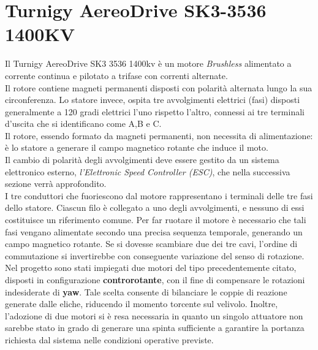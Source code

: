 \section{Turnigy AereoDrive SK3-3536 1400KV}
\label{MotoriBrushless}
Il Turnigy AereoDrive SK3 3536 1400kv è un motore \textit{Brushless} alimentato a corrente continua e pilotato a trifase con correnti alternate.\\
Il rotore contiene magneti permanenti disposti con polarità alternata lungo la sua circonferenza. Lo statore invece, ospita tre avvolgimenti elettrici (fasi) disposti generalmente a 120 gradi elettrici l'uno rispetto l'altro, connessi ai tre terminali d'uscita che si identificano come A,B e C.\\
Il rotore, essendo formato da magneti permanenti, non necessita di alimentazione: è lo statore a generare il campo magnetico rotante che induce il moto.\\
Il cambio di polarità degli avvolgimenti deve essere gestito da un sistema elettronico esterno, \textit{l'Elettronic Speed Controller (ESC)}, che nella successiva sezione verrà approfondito.\\
I tre conduttori che fuoriescono dal motore rappresentano i terminali delle tre fasi dello statore. Ciascun filo è collegato a uno degli avvolgimenti, e nessuno di essi costituisce un riferimento comune.
Per far ruotare il motore è necessario che tali fasi vengano alimentate secondo una precisa sequenza temporale, generando un campo magnetico rotante. 
Se si dovesse scambiare due dei tre cavi, l'ordine di commutazione si invertirebbe con conseguente variazione del senso di rotazione.\\
Nel progetto sono stati impiegati due motori del tipo precedentemente citato, disposti in configurazione \textbf{controrotante}, con il fine di compensare le rotazioni indesiderate di \textbf{yaw}.
Tale scelta consente di bilanciare le coppie di reazione generate dalle eliche, riducendo il momento torcente sul velivolo. Inoltre, l'adozione di due motori si è resa necessaria in quanto un singolo
attuatore non sarebbe stato in grado di generare una spinta sufficiente a garantire la portanza richiesta dal sistema nelle condizioni operative previste.

